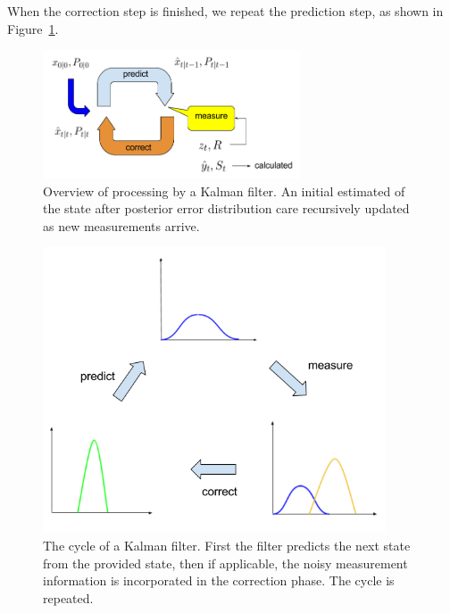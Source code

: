 When the correction step is finished, we repeat the prediction step, as shown in Figure~\ref{fig:kalmanprocess}.

\begin{figure}[t]
	\centering
	\includegraphics[width=3in]{figures/kalmanprocess.jpg}  
	\caption[kalman]{Overview of processing by a Kalman filter. An initial estimated of the state after posterior error distribution care recursively updated as new measurements arrive. }
	\label{fig:kalmanprocess}
\end{figure}

\begin{figure}[t]
	\centering
	\includegraphics[width=4in]{figures/kalman.jpg}  
	\caption[kalman]{The cycle of a Kalman filter. First the filter predicts the next state from the provided state, then if applicable, the noisy measurement information is incorporated in the correction phase. The cycle is repeated. }
	\label{fig:kalman}
\end{figure}


\FloatBarrier

